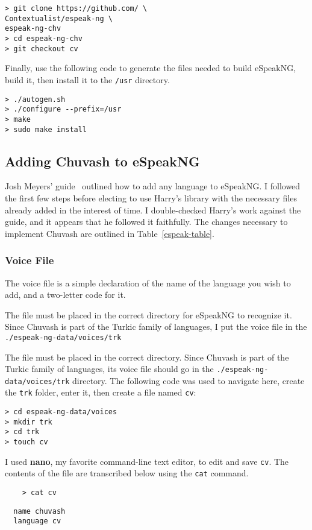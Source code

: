 \documentclass[11pt,a4paper]{article}
\begin{document}
\begin{verbatim}
> git clone https://github.com/ \
Contextualist/espeak-ng \
espeak-ng-chv
> cd espeak-ng-chv
> git checkout cv
\end{verbatim}

Finally, use the following code to generate the files needed to build eSpeakNG, build it, then install it to the \texttt{/usr} directory.

\begin{verbatim}
> ./autogen.sh
> ./configure --prefix=/usr
> make
> sudo make install
\end{verbatim}

\subsection{Adding Chuvash to eSpeakNG}
Josh Meyers' guide~\cite{jrmeyer-espeak} outlined how to add any language to eSpeakNG. I followed the first few steps before electing to use Harry's library with the necessary files already added in the interest of time. I double-checked Harry's work against the guide, and it appears that he followed it faithfully. The changes necessary to implement Chuvash are outlined in Table~\ref{espeak-table}.

\subsubsection{Voice File}
The voice file is a simple declaration of the name of the language you wish to add, and a two-letter code for it. 

The file must be placed in the correct directory for eSpeakNG to recognize it. Since Chuvash is part of the Turkic family of languages, I put the voice file in the \texttt{./espeak-ng-data/voices/trk}

The file must be placed in the correct directory. Since Chuvash is part of the Turkic family of languages, its voice file should go in the \texttt{./espeak-ng-data/voices/trk} directory. The following code was used to navigate here, create the \texttt{trk} folder, enter it, then create a file named \texttt{cv}:
\begin{verbatim}
> cd espeak-ng-data/voices
> mkdir trk
> cd trk
> touch cv
\end{verbatim}

I used \textbf{nano}, my favorite command-line text editor, to edit and save \texttt{cv}. The contents of the file are transcribed below using the \texttt{cat} command.
\begin{center}
\begin{verbatim}
	> cat cv
\end{verbatim}
\begin{Verbatim}
  name chuvash
  language cv
\end{Verbatim}
\end{center}
\end{document}
